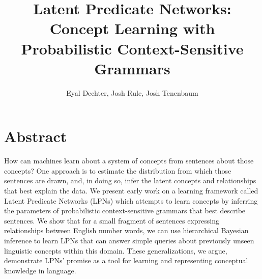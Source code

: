 \documentclass[11pt, twocolumn]{article}
\title{Latent Predicate Networks: Concept Learning with Probabilistic Context-Sensitive Grammars}
\author{Eyal Dechter,  Josh Rule, Josh Tenenbaum}
\begin{document}
\vspace{-10cm}
\maketitle

\section{Abstract}
How can machines learn about a system of concepts from sentences about
those concepts? One approach is to estimate the distribution from
which those sentences are drawn, and, in doing so, infer the latent
concepts and relationships that best explain the data. We present
early work on a learning framework called Latent Predicate Networks
(LPNs) which attempts to learn concepts by inferring the parameters of
probabilistic context-sensitive grammars that best describe sentences.
We show that for a small fragment of sentences expressing
relationships between English number words, we can use hierarchical
Bayesian inference to learn LPNs that can answer simple queries about
previously unseen linguistic concepts within this domain. These
generalizations, we argue, demonstrate LPNs' promise as a tool for
learning and representing conceptual knowledge in language.
\end{document}
